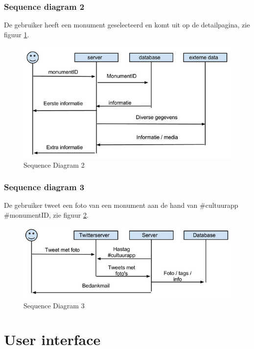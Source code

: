 \documentclass[a4paper,10pt]{article}
\begin{document}
			\subsubsection{Sequence diagram 2}
			De gebruiker heeft een monument geselecteerd en komt uit op de detailpagina, zie figuur \ref{sequence2}.
			\begin{figure}[ht!]
				\centering
				\includegraphics[width=\textwidth]{sequence2.png}
				\caption{Sequence Diagram 2 \label{sequence2}}
			\end{figure}
			\subsubsection{Sequence diagram 3}
			De gebruiker tweet een foto van een monument aan de hand van \#cultuurapp \#monumentID, zie figuur \ref{sequence3}.
			\begin{figure}[ht!]
				\centering
				\includegraphics[width=\textwidth]{sequence3.png}
				\caption{Sequence Diagram 3 \label{sequence3}}
			\end{figure}
		
		\clearpage			
		\section{User interface}
\end{document}
